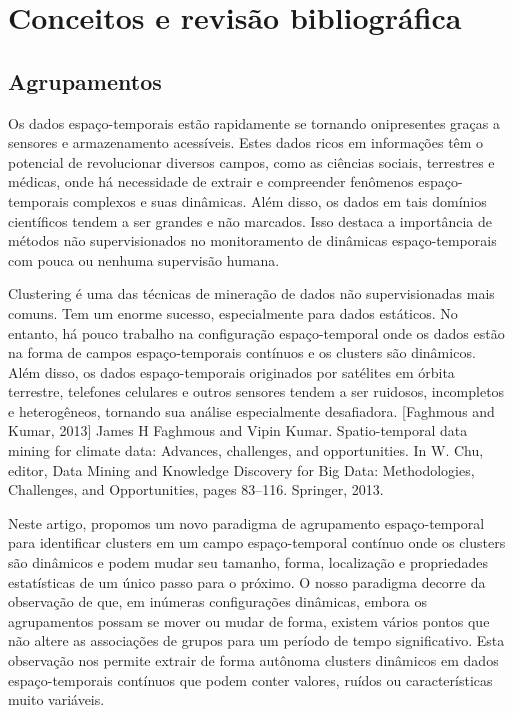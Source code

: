 \chapter{Conceitos e revisão bibliográfica}
\label{cap:estadodaarte}

\section{Agrupamentos}
Os dados espaço-temporais estão rapidamente se tornando onipresentes graças a sensores e armazenamento acessíveis. Estes dados ricos em informações têm o potencial de revolucionar diversos campos, como as ciências sociais, terrestres e médicas, onde há necessidade de extrair e compreender fenômenos espaço-temporais complexos e suas dinâmicas. Além disso, os dados em tais domínios científicos tendem a ser grandes e não marcados. Isso destaca a importância de métodos não supervisionados no monitoramento de dinâmicas espaço-temporais com pouca ou nenhuma supervisão humana.

Clustering é uma das técnicas de mineração de dados não supervisionadas mais comuns. Tem um enorme sucesso, especialmente para dados estáticos. No entanto, há pouco trabalho na configuração espaço-temporal onde os dados estão na forma de campos espaço-temporais contínuos e os clusters são dinâmicos. Além disso, os dados espaço-temporais originados por satélites em órbita terrestre, telefones celulares e outros sensores tendem a ser ruidosos, incompletos e heterogêneos, tornando sua análise especialmente desafiadora.
\cite{faghmous2013}
[Faghmous and Kumar, 2013]
James H Faghmous and Vipin
Kumar. Spatio-temporal data mining for climate data: Advances, challenges, and opportunities. In W. Chu, editor, Data Mining and Knowledge Discovery for Big Data: Methodologies, Challenges, and Opportunities, pages 83–116. Springer, 2013.

Neste artigo, propomos um novo paradigma de agrupamento espaço-temporal para identificar clusters em um campo espaço-temporal contínuo onde os clusters são dinâmicos e podem mudar seu tamanho, forma, localização e propriedades estatísticas de um único passo para o próximo. O nosso paradigma decorre da observação de que, em inúmeras configurações dinâmicas, embora os agrupamentos possam se mover ou mudar de forma, existem vários pontos que não altere as associações de grupos para um período de tempo significativo.
Esta observação nos permite extrair de forma autônoma clusters dinâmicos em dados espaço-temporais contínuos que podem conter valores, ruídos ou características muito variáveis.

